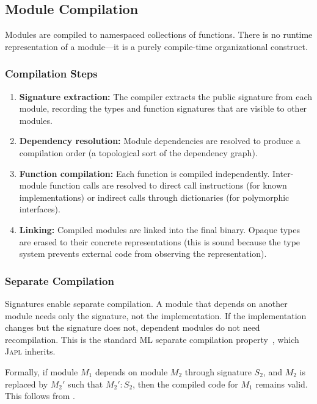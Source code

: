 \documentclass[11pt,a4paper]{article}
\newcommand{\japl}{\textsc{Japl}}
\begin{document}
\subsection{Module Compilation}

Modules are compiled to namespaced collections of functions. There is no runtime representation of a module---it is a purely compile-time organizational construct.

\subsubsection{Compilation Steps}

\begin{enumerate}
  \item \textbf{Signature extraction:} The compiler extracts the public signature from each module, recording the types and function signatures that are visible to other modules.
  \item \textbf{Dependency resolution:} Module dependencies are resolved to produce a compilation order (a topological sort of the dependency graph).
  \item \textbf{Function compilation:} Each function is compiled independently. Inter-module function calls are resolved to direct call instructions (for known implementations) or indirect calls through dictionaries (for polymorphic interfaces).
  \item \textbf{Linking:} Compiled modules are linked into the final binary. Opaque types are erased to their concrete representations (this is sound because the type system prevents external code from observing the representation).
\end{enumerate}

\subsubsection{Separate Compilation}

Signatures enable separate compilation. A module that depends on another module needs only the signature, not the implementation. If the implementation changes but the signature does not, dependent modules do not need recompilation. This is the standard ML separate compilation property~\citep{harper1990type}, which \japl{} inherits.

Formally, if module $M_1$ depends on module $M_2$ through signature $S_2$, and $M_2$ is replaced by $M_2'$ such that $M_2' : S_2$, then the compiled code for $M_1$ remains valid. This follows from .
\end{document}
